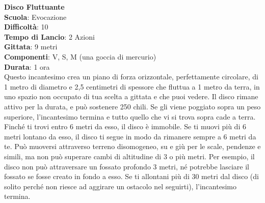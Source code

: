 \begin{multicols}{2}
\medskip\textbf{Disco Fluttuante}\\
\textbf{Scuola}: Evocazione\\\textbf{Difficoltà}:  10\\
\textbf{Tempo di Lancio}: 2 Azioni\\
\textbf{Gittata}: 9 metri\\
\textbf{Componenti}: V, S, M (una goccia di mercurio)\\
\textbf{Durata}: 1 ora\\
Questo incantesimo crea un piano di forza orizzontale, perfettamente circolare, di 1 metro di diametro e 2,5 centimetri di spessore che fluttua a 1 metro da terra, in uno spazio non occupato di tua scelta a gittata e che puoi vedere. Il disco rimane attivo per la durata, e può sostenere 250 chili. Se gli viene poggiato sopra un peso superiore, l'incantesimo termina e tutto quello che vi si trova sopra cade a terra. Finché ti trovi entro 6 metri da esso, il disco è immobile. Se ti muovi più di 6 metri lontano da esso, il disco ti segue in modo da rimanere sempre a 6 metri da te. Può muoversi attraverso terreno disomogeneo, su e giù per le scale, pendenze e simili, ma non può superare cambi di altitudine di 3 o più metri. Per esempio, il disco non può attraversare un fossato profondo 3 metri, né potrebbe lasciare il fossato se fosse creato in fondo a esso. Se ti allontani più di 30 metri dal disco (di solito perché non riesce ad aggirare un ostacolo nel seguirti), l'incantesimo termina.


\end{multicols}
